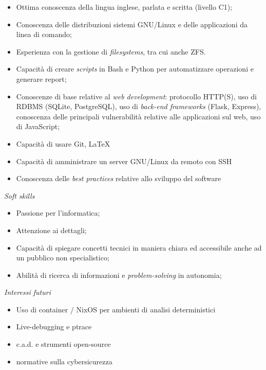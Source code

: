 \documentclass[12pt]{article}
\begin{document}
\begin{itemize}
	\item Ottima conoscenza della lingua inglese, parlata e scritta (livello C1);
	\item Conoscenza delle distribuzioni sistemi GNU/Linux e delle applicazioni da linea di comando;
	\item Esperienza con la gestione di \textit{filesystems}, tra cui anche ZFS.
	\item Capacità di creare \textit{scripts} in Bash e Python per automatizzare operazioni e generare report;
	\item Conoscenze di base relative al \textit{web development}: protocollo HTTP(S), uso di RDBMS (SQLite, PostgreSQL), uso di \textit{back-end frameworks} (Flask, Express), conoscenza delle principali vulnerabilità relative alle applicazioni sul web, uso di JavaScript;
	\item Capacità di usare Git, LaTeX
	\item Capacità di amministrare un server GNU/Linux da remoto con SSH
	\item Conoscenza delle \textit{best practices} relative allo sviluppo del software
\end{itemize}

{\Large \textit{Soft skills}}

\begin{itemize}
	\item Passione per l'informatica;
	\item Attenzione ai dettagli;
	\item Capacità di spiegare concetti tecnici in maniera chiara ed accessibile anche ad un pubblico non specialistico;
	\item Abilità di ricerca di informazioni e \textit{problem-solving} in autonomia;
\end{itemize}

{\Large \textit{Interessi futuri}}

\begin{itemize}
	\item Uso di container / NixOS per ambienti di analisi deterministici
	\item Live-debugging e ptrace
	\item c.a.d. e strumenti open-source
	\item normative sulla cybersicurezza
\end{itemize}
\end{document}
